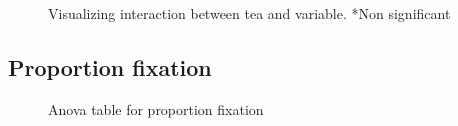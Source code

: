 \documentclass{article}
\begin{document}
\begin{figure}[H]
  \caption{Visualizing interaction between tea and variable. *Non significant}
  \noindent{}
  \centering
\end{figure}

\subsection{Proportion fixation}


\begin{figure}[H]
  \caption{Anova table for proportion fixation}
  \noindent{}
  \centering
\end{figure}
\end{document}
